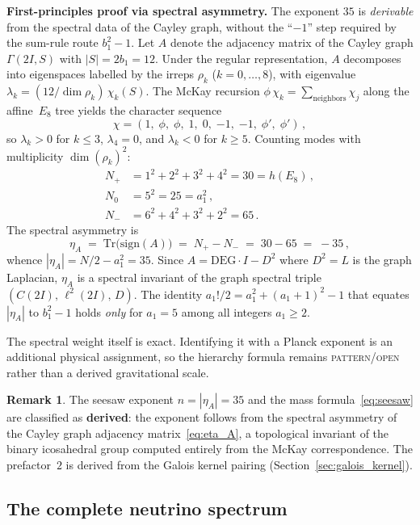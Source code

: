\documentclass[12pt,a4paper]{article}
\theoremstyle{definition}
\newtheorem{remark}{Remark}
\begin{document}
\textbf{First-principles proof via spectral asymmetry.}
The exponent $35$ is \emph{derivable} from the spectral data of the Cayley graph, without the ``$-1$'' step required by the sum-rule route $b_1^2 - 1$.  Let $A$ denote the adjacency matrix of the Cayley graph $\Gamma(2I, S)$ with $|S| = 2b_1 = 12$.  Under the regular representation, $A$ decomposes into eigenspaces labelled by the irreps $\rho_k$ ($k = 0, \ldots, 8$), with eigenvalue $\lambda_k = (12/\dim\rho_k)\,\chi_k(S)$.  The McKay recursion $\phi\,\chi_k = \sum_{\text{neighbors}}\chi_j$ along the affine~$E_8$ tree yields the character sequence
\[
\chi = (1,\;\phi,\;\phi,\;1,\;0,\;{-1},\;{-1},\;\phi',\;\phi')\,,
\]
so $\lambda_k > 0$ for $k \le 3$, $\lambda_4 = 0$, and $\lambda_k < 0$ for $k \ge 5$.  Counting modes with multiplicity $\dim(\rho_k)^2$:
\begin{align}
N_+ &= 1^2 + 2^2 + 3^2 + 4^2 = 30 = h(E_8)\,,\\
N_0 &= 5^2 = 25 = a_1^2\,,\\
N_- &= 6^2 + 4^2 + 3^2 + 2^2 = 65\,.
\end{align}
The spectral asymmetry is
\begin{equation}
\eta_A \;=\; \mathrm{Tr}\bigl(\mathrm{sign}(A)\bigr) \;=\; N_+ - N_- \;=\; 30 - 65 \;=\; -35\,,
\label{eq:eta_A}
\end{equation}
whence $|\eta_A| = N/2 - a_1^2 = 35$.  Since $A = \mathrm{DEG}\cdot I - D^2$ where $D^2 = L$ is the graph Laplacian, $\eta_A$ is a spectral invariant of the graph spectral triple $(C(2I),\,\ell^2(2I),\,D)$.  The identity $a_1!/2 = a_1^2 + (a_1{+}1)^2 - 1$ that equates $|\eta_A|$ to $b_1^2 - 1$ holds \emph{only} for $a_1 = 5$ among all integers $a_1 \ge 2$.

The spectral weight itself is exact.  Identifying it with a Planck exponent is
an additional physical assignment, so the hierarchy formula remains
\textsc{pattern/open} rather than a derived gravitational scale.

\begin{remark}
The seesaw exponent $n = |\eta_A| = 35$ and the mass formula~\eqref{eq:seesaw} are classified as \textbf{derived}: the exponent follows from the spectral asymmetry of the Cayley graph adjacency matrix~\eqref{eq:eta_A}, a topological invariant of the binary icosahedral group computed entirely from the McKay correspondence.  The prefactor~$2$ is derived from the Galois kernel pairing (Section~\ref{sec:galois_kernel}).
\end{remark}

\subsection{The complete neutrino spectrum}\label{sec:nu_spectrum}
\end{document}
